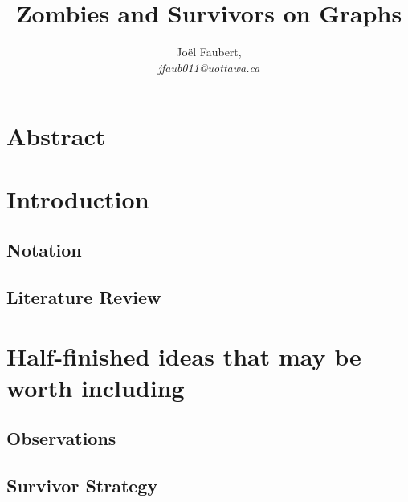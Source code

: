 \documentclass[letterpaper, 12pt]{report}
\title{Zombies and Survivors on Graphs}
\author{Jo\"el Faubert, \\ \textit{jfaub011@uottawa.ca}}
\theoremstyle{definition}
\begin{document}

\hypersetup{pageanchor=false}


\hypersetup{pageanchor=true}


\chapter*{Abstract}


\tableofcontents

\cleardoublepage{}

\chapter{Introduction}



\section{Notation}


\section{Literature Review}


\chapter{Half-finished ideas that may be worth including}
\section{Observations}


%

\section{Survivor Strategy}


%
\end{document}
